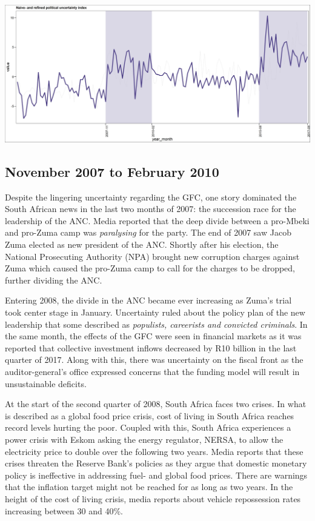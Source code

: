\documentclass[11pt,preprint, authoryear]{elsarticle}
\let\origfigure\figure
\let\endorigfigure\endfigure
\renewenvironment{figure}[1][2] {
    \expandafter\origfigure\expandafter[H]
} {
    \endorigfigure
}
\numberwithin{equation}{section}
\numberwithin{figure}{section}
\numberwithin{table}{section}
\begin{document}
\begin{figure}
	\centering
	\includegraphics[width=\linewidth, keepaspectratio]{bin/pol_comps}\\
	\caption{Composite Political uncertainty refined index. \label{pol_comp_final}}
\end{figure}

\subsection{November 2007 to February
2010}\label{november-2007-to-february-2010}

Despite the lingering uncertainty regarding the GFC, one story dominated
the South African news in the last two months of 2007: the succession
race for the leadership of the ANC. Media reported that the deep divide
between a pro-Mbeki and pro-Zuma camp was \emph{paralysing} for the
party. The end of 2007 saw Jacob Zuma elected as new president of the
ANC. Shortly after his election, the National Prosecuting Authority
(NPA) brought new corruption charges against Zuma which caused the
pro-Zuma camp to call for the charges to be dropped, further dividing
the ANC.

Entering 2008, the divide in the ANC became ever increasing as Zuma's
trial took center stage in January. Uncertainty ruled about the policy
plan of the new leadership that some described as
\emph{populists, careerists and convicted criminals}. In the same month,
the effects of the GFC were seen in financial markets as it was reported
that collective investment inflows decreased by R10 billion in the last
quarter of 2017. Along with this, there was uncertainty on the fiscal
front as the auditor-general's office expressed concerns that the
funding model will result in unsustainable deficits.

At the start of the second quarter of 2008, South Africa faces two
crises. In what is described as a global food price crisis, cost of
living in South Africa reaches record levels hurting the poor. Coupled
with this, South Africa experiences a power crisis with Eskom asking the
energy regulator, NERSA, to allow the electricity price to double over
the following two years. Media reports that these crises threaten the
Reserve Bank's policies as they argue that domestic monetary policy is
ineffective in addressing fuel- and global food prices. There are
warnings that the inflation target might not be reached for as long as
two years. In the height of the cost of living crisis, media reports
about vehicle repossession rates increasing between 30 and 40\%.
\end{document}
